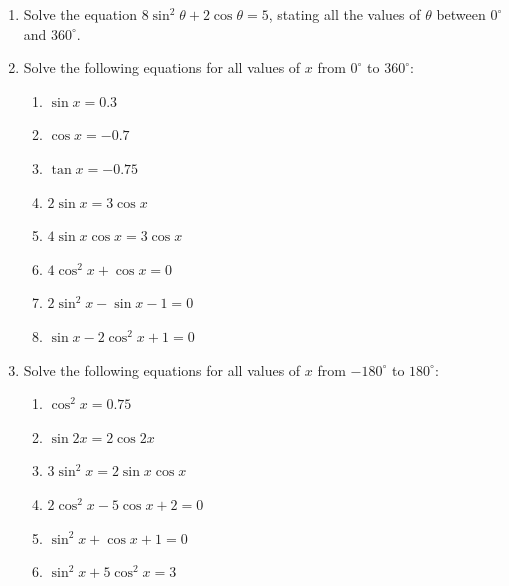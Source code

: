 \documentclass[
  english,
  12pt,
  oneside]{book}
\providecommand{\tightlist}{%
  \setlength{\itemsep}{0pt}\setlength{\parskip}{0pt}}
\theoremstyle{definition}
\theoremstyle{definition}
\theoremstyle{definition}
\theoremstyle{definition}
\theoremstyle{remark}
\begin{document}
\begin{enumerate}
  \begin{enumerate}
  \def\labelenumii{\roman{enumii})}
  \tightlist
  \item
    \(\tan^2\theta\,(\mathrm{cosec}^2\theta -1)=1\)
  \item
    \(\tan\theta = \sqrt{\dfrac{1-\cos^2\theta}{\cos^2\theta}}\)
  \item
    \(\dfrac{\mathrm{cosec}\,\theta}{\sec\theta}-\dfrac{\sec\theta}{\mathrm{cosec}\,\theta} = (\cos^2\theta-\sin^2\theta)\sec\theta\,\mathrm{cosec}\,\theta\)
  \item
    \(\sin\theta-\sin^3\theta = \dfrac{\sin\theta}{\sec^2\theta}\)
  \end{enumerate}
\item
  Solve the equation \(8 \sin^2\theta + 2 \cos\theta = 5\), stating all the values of \(\theta\) between \(0^\circ\) and \(360^\circ\).
\item
  Solve the following equations for all values of \(x\) from \(0^\circ\) to \(360^\circ\):

  \begin{enumerate}
  \def\labelenumii{\alph{enumii})}
  \tightlist
  \item
    \(\sin x=0.3\)
  \item
    \(\cos x=-0.7\)
  \item
    \(\tan x=-0.75\)
  \item
    \(2\sin x=3\cos x\)
  \item
    \(4\sin x\cos x = 3\cos x\)
  \item
    \(4\cos^2 x+\cos x = 0\)
  \item
    \(2\sin^2 x-\sin x-1=0\)
  \item
    \(\sin x-2\cos^2 x+1=0\)
  \end{enumerate}
\item
  Solve the following equations for all values of \(x\) from \(-180^\circ\) to \(180^\circ\):

  \begin{enumerate}
  \def\labelenumii{\alph{enumii})}
  \tightlist
  \item
    \(\cos^2 x=0.75\)
  \item
    \(\sin 2x = 2\cos 2x\)
  \item
    \(3\sin^2 x=2\sin x\cos x\)
  \item
    \(2\cos^2 x-5\cos x+2=0\)
  \item
    \(\sin^2 x+\cos x+1=0\)
  \item
    \(\sin^2 x+5\cos^2 x =3\)
  \end{enumerate}
\end{enumerate}
\end{document}

